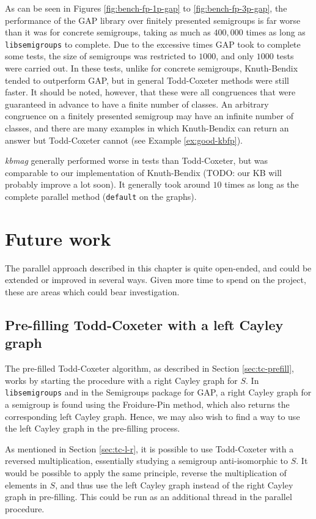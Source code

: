 As can be seen in Figures \ref{fig:bench-fp-1p-gap} to \ref{fig:bench-fp-3p-gap}, the
performance of the GAP library over finitely presented semigroups is far worse
than it was for concrete semigroups, taking as much as $400,000$ times as long
as \texttt{libsemigroups} to complete.  Due to the excessive times GAP took to
complete some tests, the size of semigroups was restricted to $1000$, and only
$1000$ tests were carried out.  In these tests, unlike for concrete semigroups,
Knuth-Bendix tended to outperform GAP, but in
general Todd-Coxeter methods were still faster.  It should be noted, however,
that these were all congruences that were guaranteed in advance to have a finite
number of classes.  An arbitrary congruence on a finitely presented semigroup
may have an infinite number of classes, and there are many examples in which
Knuth-Bendix can return an answer but Todd-Coxeter cannot (see Example
\ref{ex:good-kbfp}).

\textit{kbmag} generally performed worse in tests than Todd-Coxeter, but was
comparable to our implementation of Knuth-Bendix (TODO: our KB will probably
improve a lot soon).  It generally took around $10$ times as long as the
complete parallel method (\texttt{default} on the graphs).

\clearpage

\section{Future work}

The parallel approach described in this chapter is quite open-ended, and could
be extended or improved in several ways.  Given more time to spend on the
project, these are areas which could bear investigation.

\subsection{Pre-filling Todd-Coxeter with a left Cayley graph}
\label{sec:prefill-left}
The pre-filled Todd-Coxeter algorithm, as described in Section
\ref{sec:tc-prefill}, works by starting the procedure with a right Cayley graph
for $S$.  In \texttt{libsemigroups} and in the Semigroups package for GAP, a
right Cayley graph for a semigroup is found using the Froidure-Pin method, which
also returns the corresponding left Cayley graph.  Hence, we may also wish to
find a way to use the left Cayley graph in the pre-filling process.

As mentioned in Section \ref{sec:tc-l-r}, it is possible to use Todd-Coxeter
with a reversed multiplication, essentially studying a semigroup anti-isomorphic
to $S$.  It would be possible to apply the same principle, reverse the
multiplication of elements in $S$, and thus use the left Cayley graph instead of
the right Cayley graph in pre-filling.  This could be run as an additional
thread in the parallel procedure.

